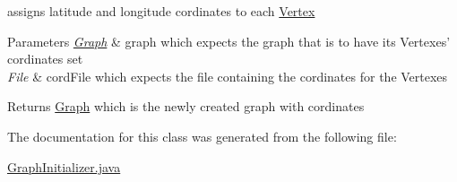 assigns latitude and longitude cordinates to each \hyperlink{class_vertex}{Vertex} 


\begin{DoxyParams}{Parameters}
{\em \hyperlink{class_graph}{Graph}} & graph which expects the graph that is to have its Vertexes' cordinates set \\
\hline
{\em File} & cord\+File which expects the file containing the cordinates for the Vertexes \\
\hline
\end{DoxyParams}
\begin{DoxyReturn}{Returns}
\hyperlink{class_graph}{Graph} which is the newly created graph with cordinates 
\end{DoxyReturn}


The documentation for this class was generated from the following file\+:\begin{DoxyCompactItemize}
\item 
\hyperlink{_graph_initializer_8java}{Graph\+Initializer.\+java}\end{DoxyCompactItemize}
